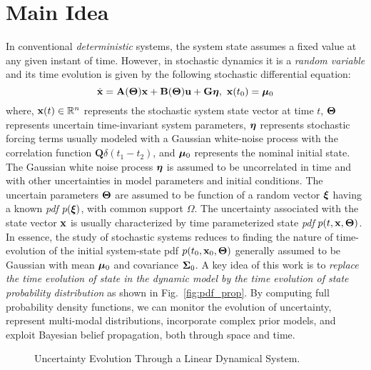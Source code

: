 \documentclass[10pt, conference]{IEEEtran}
\begin{document}
\section{Main Idea}
In conventional \textit{deterministic} systems, the system state assumes a fixed value at any given instant of time. However, in stochastic dynamics it is a \textit{random variable} and its time evolution is given by the following stochastic differential equation:
\begin{equation} \label{stochmodel}
\dot{\mathbf{x}} = \mathbf{A}(\boldsymbol{\Theta})\mathbf{x} + \mathbf{B}(\boldsymbol{\Theta})\mathbf{u}+ \mathbf{G}\boldsymbol{\eta},\ \mathbf{x}(t_0) =\boldsymbol{\mu}_0 \\
\end{equation}
where,  $\mathbf{x}(t) \in \mathbb R^n$ represents the stochastic system state vector at time $t$, $\boldsymbol{\Theta}$ represents uncertain time-invariant system parameters, $\boldsymbol{\eta}$ represents stochastic forcing terms usually modeled with a Gaussian white-noise process with the correlation function $\mathbf{Q}\delta(t_1-t_2)$, and $\boldsymbol{\mu}_0$ represents the nominal initial state. The Gaussian white noise process $\boldsymbol{\eta}$ is assumed to be uncorrelated in time and with other uncertainties in model parameters and initial conditions. The uncertain parameters $\boldsymbol{\Theta}$ are assumed to be function of a random vector $\boldsymbol{\xi}$ having a known \textit{pdf} $p(\boldsymbol{\xi})$, with common support $\Omega$.  The uncertainty associated with the state vector $\mathbf{x}$ is usually characterized by time parameterized state \textit{pdf} $p(t,\mathbf{x},\boldsymbol{\Theta})$. In essence, the study of stochastic systems reduces to finding the nature of time-evolution of the initial system-state pdf $p(t_0,\mathbf{x}_0,\boldsymbol{\Theta})$ generally assumed to be Gaussian with mean $\boldsymbol{\mu}_0$ and covariance $\boldsymbol{\Sigma}_0$. A key idea of this work is to \textit{replace the time evolution of state in the dynamic model by the time evolution of state probability distribution} as shown in Fig.~\ref{fig:pdf_prop}. By computing full probability density functions, we can monitor the evolution of uncertainty, represent multi-modal distributions, incorporate complex prior models, and exploit Bayesian belief propagation, both through space and time.

\begin{figure*}[ht]
\caption{Uncertainty Evolution Through a Linear Dynamical System.}\label{fig:uncert_evolution}
\end{figure*}
\end{document}
